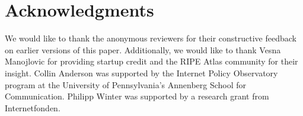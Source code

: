 \section*{Acknowledgments}

We would like to thank the anonymous reviewers for their constructive
feedback on earlier versions of this paper. Additionally, we would like
to thank Vesna Manojlovic for providing startup credit and the RIPE
Atlas community for their insight. Collin Anderson was supported by the
Internet Policy Observatory program at the University of Pennsylvania's
Annenberg School for Communication. Philipp Winter was supported by a research
grant from Internetfonden.
